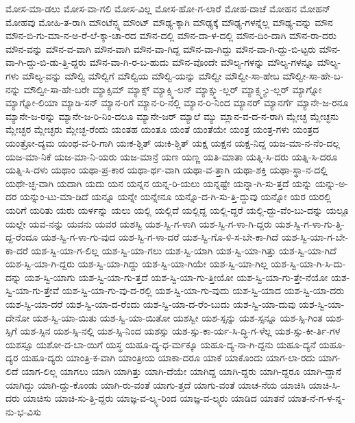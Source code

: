 {ಮೋಸ-ಮಾ-ಡಲು
ಮೋಸ-ವಾ-ಗಲಿ
ಮೋಸ-ವಿಲ್ಲ
ಮೋಸ-ಹೋ-ಗ-ಲಾರೆ
ಮೋಹ-ದಾಚೆ
ಮೋಹನ
ಮೋಹನ್
ಮೋಹವು
ಮೋಹಿ-ತ-ರಾಗಿ
ಮೌಂಟೆನ್ಸ್ನ
ಮೌಂಟ್
ಮೌಢ್ಯ-ಕ್ಕಾಗಿ
ಮೌಢ್ಯಕ್ಕೆ
ಮೌಢ್ಯ-ಗಳನ್ನೆಲ್ಲ
ಮೌಢ್ಯ-ವನ್ನು
ಮೌನ
ಮೌನ-ಬಿ-ಗು-ಮಾ-ನ-ಅ-ರೆ-ಲೆ-ಕ್ಕಾ-ಚಾ-ರದ
ಮೌನ-ದಲ್ಲಿ
ಮೌನ-ದಾ-ಳ-ದಲ್ಲಿ
ಮೌನ-ದಿಂ-ದಾಗಿ
ಮೌನ-ರಾ-ದರು
ಮೌನ-ವನ್ನು
ಮೌನ-ವ-ವಾಗಿ
ಮೌನ-ವಾಗಿ
ಮೌನ-ವಾ-ಗಿದ್ದ
ಮೌನ-ವಾ-ಗಿದ್ದು
ಮೌನ-ವಾ-ಗಿ-ದ್ದು-ಬಿ-ಟ್ಟರು
ಮೌನ-ವಾ-ಗಿ-ದ್ದು-ಬಿ-ಡು-ತ್ತಿ-ದ್ದರು
ಮೌನ-ವಾ-ಗಿ-ರ-ಬ-ಹುದು
ಮೌನ-ವೊಂದೇ
ಮೌಲ್ಯ-ಗಳನ್ನು
ಮೌಲ್ಯ-ಗಳನ್ನೂ
ಮೌಲ್ಯ-ಗಳು
ಮೌಲ್ಯ-ವನ್ನು
ಮೌಲ್ವಿ
ಮೌಲ್ವಿಗೆ
ಮೌಲ್ವಿಯ
ಮೌಲ್ವಿ-ಯನ್ನು
ಮೌಲ್ವೀ
ಮೌಲ್ವೀ-ಸಾ-ಹೇಬ
ಮೌಲ್ವೀ-ಸಾ-ಹೇ-ಬ-ನನ್ನು
ಮೌಲ್ವೀ-ಸಾ-ಹೇ-ಬರೇ
ಮ್ಯಾಕ್ಸಿಮ್
ಮ್ಯಾಕ್ಸ್
ಮ್ಯಾಕ್ಸ್ಮಿ-ಲನ್
ಮ್ಯಾಕ್ಸ್ಮು-ಲ್ಲರ್
ಮ್ಯಾಕ್ಸ್ಮ-್ಯು-ಲ್ಲರ್
ಮ್ಯಾಗ್ನೋ
ಮ್ಯಾಗ್ನೋ-ಲಿಯಾ
ಮ್ಯಾಡಿ-ಸನ್
ಮ್ಯಾನ-ರಿಗೆ
ಮ್ಯಾನ-ರಿ-ನಲ್ಲಿ
ಮ್ಯಾನ-ರಿ-ನಿಂದ
ಮ್ಯಾನರ್
ಮ್ಯಾನರ್ಗೆ
ಮ್ಯಾನೇ-ಜ-ರನೂ
ಮ್ಯಾನೇ-ಜ-ರನ್ನು
ಮ್ಯಾನೇ-ಜ-ರಿ-ನಿಂ-ದಲೂ
ಮ್ಯಾನೇ-ಜರ್
ಮ್ಯಾಲೆ
ಮ್ಯು
ಮ್ಲಾನ-ವ-ದ-ನ-ರಾಗಿ
ಮ್ಲೇಚ್ಛ
ಮ್ಲೇಚ್ಛನು
ಮ್ಲೇಚ್ಛರ
ಮ್ಲೇಚ್ಛರು
ಮ್ಲೇಚ್ಛ-ರೆಂದು
ಯಂತಹ
ಯಂತೂ
ಯಂತೆ
ಯಂತೆಯೇ
ಯಂತ್ರ
ಯಂತ್ರ-ಗಳು
ಯಂತ್ರದ
ಯಂತ್ರೋ-ದ್ಯಮ
ಯಂಥ-ವ-ರಿ-ಗಾಗಿ
ಯಃಕ-ಶ್ಚಿತ್
ಯಃಕಿ-ಶ್ಚಿತ್
ಯಕ್ಷ
ಯಕ್ಷನ
ಯಕ್ಷ-ನಿದ್ದ
ಯಜ-ಮಾ-ನ-ನೆಂ-ದಲ್ಲ
ಯಜ-ಮಾ-ನಿಕೆ
ಯಜ-ಮಾ-ನಿ-ಯರು
ಯಜ-ಮಾನ್ರೆ
ಯಣ
ಯಣ್ಣ
ಯತಿ-ಮಾತಾ
ಯತ್ನಿ-ಸಿ-ದರು
ಯತ್ನಿ-ಸಿ-ದರೂ
ಯತ್ನಿ-ಸಿ-ದಳು
ಯಥಾಂ
ಯಥಾ-ಪ್ರ-ಕಾರ
ಯಥಾ-ರ್ಥ-ವಾಗಿ
ಯಥಾ-ವ-ತ್ತಾಗಿ
ಯಥಾ-ಶಕ್ತಿ
ಯಥಾ-ಸ್ಥಾ-ನ-ದಲ್ಲಿ
ಯಥೇ-ಚ್ಛ-ವಾಗಿ
ಯದಾಗಿ
ಯದು
ಯನ
ಯನ್ನನ
ಯನ್ನ-ರಿ-ಯಲು
ಯನ್ನಷ್ಟೇ
ಯನ್ನಾ-ಗಿ-ಸು-ತ್ತದೆ
ಯನ್ನು
ಯನ್ನು-ಅ-ದರ
ಯನ್ನುಂ-ಟು-ಮಾ-ಡಿದೆ
ಯನ್ನೂ
ಯನ್ನೇ
ಯನ್ನೇನೂ
ಯನ್ನೊ-ದ-ಗಿ-ಸು-ತ್ತಿ-ದ್ದುವು
ಯನ್ನೋ
ಯರ
ಯರಲ್ಲಿ
ಯರಿಗೆ
ಯರಿತು
ಯರು
ಯರ್ಳನ್ನು
ಯಲು
ಯಲ್ಲಿ
ಯಲ್ಲಿದೆ
ಯಲ್ಲಿದ್ದ
ಯಲ್ಲಿ-ದ್ದರೆ
ಯಲ್ಲಿ-ದ್ದು-ವೆಂ-ಬು-ದನ್ನು
ಯಲ್ಲೂ
ಯಲ್ಲೇ
ಯವ-ನನ್ನು
ಯವನು
ಯವರ
ಯಶಸ್ವಿ
ಯಶ-ಸ್ವಿ-ಗ-ಳಾಗಿ
ಯಶ-ಸ್ವಿ-ಗ-ಳಾ-ಗಿ-ದ್ದರು
ಯಶ-ಸ್ವಿ-ಗ-ಳಾ-ಗು-ತ್ತಿ-ದ್ದ-ರೆಂದೂ
ಯಶ-ಸ್ವಿ-ಗ-ಳಾ-ಗು-ವುದ
ಯಶ-ಸ್ವಿ-ಗ-ಳಾ-ದರೆ
ಯಶ-ಸ್ವಿ-ಗೊ-ಳಿ-ಸ-ಬೇ-ಕಾ-ಗಿದೆ
ಯಶ-ಸ್ವಿ-ಯಾ-ಗ-ಬೇ-ಕಾ-ದರೆ
ಯಶ-ಸ್ವಿ-ಯಾ-ಗ-ಲಿಲ್ಲ
ಯಶ-ಸ್ವಿ-ಯಾ-ಗಲು
ಯಶ-ಸ್ವಿ-ಯಾಗಿ
ಯಶ-ಸ್ವಿ-ಯಾ-ಗಿತ್ತು
ಯಶ-ಸ್ವಿ-ಯಾ-ಗಿದೆ
ಯಶ-ಸ್ವಿ-ಯಾ-ಗಿ-ದ್ದರು
ಯಶ-ಸ್ವಿ-ಯಾ-ಗಿದ್ದು
ಯಶ-ಸ್ವಿ-ಯಾ-ಗಿಯೇ
ಯಶ-ಸ್ವಿ-ಯಾ-ಗಿಲ್ಲ
ಯಶ-ಸ್ವಿ-ಯಾ-ಗಿ-ಸಿ-ದು-ದನ್ನು
ಯಶ-ಸ್ವಿ-ಯಾಗು
ಯಶ-ಸ್ವಿ-ಯಾ-ಗು-ತ್ತದೆ
ಯಶ-ಸ್ವಿ-ಯಾ-ಗು-ತ್ತೀಯೋ
ಯಶ-ಸ್ವಿ-ಯಾ-ಗು-ತ್ತೇ-ನೆಯೋ
ಯಶ-ಸ್ವಿ-ಯಾ-ಗು-ತ್ತೇವೆ
ಯಶ-ಸ್ವಿ-ಯಾ-ಗು-ವು-ದ-ರಲ್ಲಿ
ಯಶ-ಸ್ವಿ-ಯಾ-ಗು-ವುದು
ಯಶ-ಸ್ವಿ-ಯಾದ
ಯಶ-ಸ್ವಿ-ಯಾ-ದರು
ಯಶ-ಸ್ವಿ-ಯಾ-ದರೆ
ಯಶ-ಸ್ವಿ-ಯಾ-ದ-ರೆಂದು
ಯಶ-ಸ್ವಿ-ಯಾ-ದ-ರೆಂ-ಬುದು
ಯಶ-ಸ್ವಿ-ಯಾ-ದುವು
ಯಶ-ಸ್ವಿ-ಯಾ-ದೇನೋ
ಯಶ-ಸ್ವಿ-ಯಾ-ಯಿತು
ಯಶ-ಸ್ವಿ-ಯಾ-ಯಿತೋ
ಯಶಸ್ವೀ
ಯಶ-ಸ್ಸನ್ನು
ಯಶ-ಸ್ಸನ್ನೂ
ಯಶ-ಸ್ಸಿ-ಗಿಂತ
ಯಶ-ಸ್ಸಿಗೆ
ಯಶ-ಸ್ಸಿನ
ಯಶ-ಸ್ಸಿ-ನಲ್ಲಿ
ಯಶ-ಸ್ಸಿ-ನಿಂದ
ಯಶಸ್ಸು
ಯಶ-ಸ್ಸು-ಕಾ-ರ್ಯ-ಸಿ-ದ್ಧಿ-ಗ-ಳೆಲ್ಲ
ಯಶ-ಸ್ಸು-ಕೀ-ರ್ತಿ-ಗಳ
ಯಶಸ್ಸೂ
ಯಶೋ-ದ-ಬಾ-ಯಿಗೆ
ಯಸ್ಥ
ಯಹೂ-ದ್ಯ-ಧ-ರ್ಮಕ್ಕೂ
ಯಹೂ-ದ್ಯ-ನಾ-ಗಿ-ದ್ದನು
ಯಹೂ-ದ್ಯನೆ
ಯಹೂ-ದ್ಯರ
ಯಹೂ-ದ್ಯರು
ಯಾಂತ್ರಿ-ಕ-ವಾಗಿ
ಯಾಂತ್ರೀಯ
ಯಾಕಾ-ದರೂ
ಯಾಕೆ
ಯಾಕೊಂದು
ಯಾಗ-ಲಾ-ರದು
ಯಾಗ-ಲಿದೆ
ಯಾಗ-ಲಿಲ್ಲ
ಯಾಗಲು
ಯಾಗಿ
ಯಾಗಿತ್ತು
ಯಾಗಿ-ದೆಯೇ
ಯಾಗಿದ್ದ
ಯಾಗಿ-ದ್ದರು
ಯಾಗಿ-ದ್ದರೂ
ಯಾಗಿ-ದ್ದಾನೆ
ಯಾಗಿದ್ದು
ಯಾಗಿ-ದ್ದು-ಕೊಂಡು
ಯಾಗಿ-ರು-ವಂತೆ
ಯಾಗು-ತ್ತದೆ
ಯಾಗು-ವಂತೆ
ಯಾಚ-ನೆಯ
ಯಾಚಿಸಿ
ಯಾಚಿ-ಸಿ-ದರು
ಯಾಚಿಸು
ಯಾಚಿ-ಸು-ತ್ತಿ-ದ್ದರು
ಯಾಜ್ಞ-ವ-ಲ್ಕ್ಯ-ರಿಂದ
ಯಾಜ್ಞ-ವ-ಲ್ಕ್ಯರು
ಯಾಡಿದ
ಯಾತನೆ
ಯಾತ-ನೆ-ಗ-ಳ-ನ್ನ-ನು-ಭ-ವಿಸು
}
